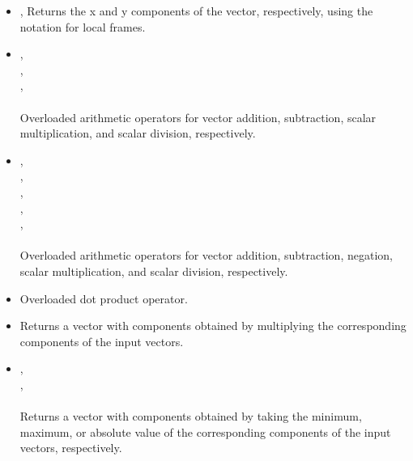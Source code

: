 \documentclass[a4paper,onecolumn,11pt]{doofus}
\begin{document}
\begin{itemize}
\item {},  Returns the x and y components of the vector, respectively, using the notation for local frames.

\item {},\\ 
,\\ 
,\\ 
\\ 
Overloaded arithmetic operators for vector addition, subtraction, scalar multiplication, and scalar division, respectively.

\item {},\\
,\\ 
,\\ 
,\\ 
,\\ 
\\ 
Overloaded arithmetic operators for vector addition, subtraction, negation, scalar multiplication, and scalar division, respectively.

\item {} Overloaded dot product operator.

\item {} Returns a vector with components obtained by multiplying the corresponding components of the input vectors.

\item {},\\,\\ \\ Returns a vector with components obtained by taking the minimum, maximum, or absolute value of the corresponding components of the input vectors, respectively.


\end{itemize}
\end{document}
